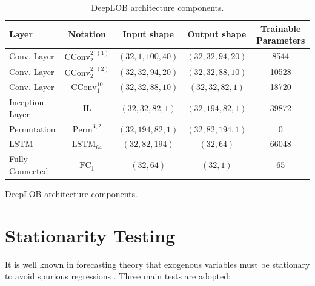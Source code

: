 \documentclass[10pt,a4paper,oneside]{article}
\DeclareMathOperator{\perm}{Perm}
\DeclareMathOperator{\fullyconnected}{FC}
\DeclareMathOperator{\lstm}{LSTM}
\providecommand{\DIFaddtex}[1]{{\protect\color{blue} \sf #1}} %
\providecommand{\DIFdeltex}[1]{{\protect\color{red} \scriptsize #1}} %
\providecommand{\DIFaddFL}[1]{\DIFadd{#1}} %
\providecommand{\DIFdelFL}[1]{\DIFdel{#1}} %
\providecommand{\DIFaddbeginFL}{} %
\providecommand{\DIFaddendFL}{} %
\providecommand{\DIFdelbeginFL}{} %
\providecommand{\DIFdelendFL}{} %
\providecommand{\DIFadd}[1]{\texorpdfstring{\DIFaddtex{#1}}{#1}} %
\providecommand{\DIFdel}[1]{\texorpdfstring{\DIFdeltex{#1}}{}} %
\newcommand{\DIFscaledelfig}{0.5}
\newlength{\DIFdelgraphicswidth} %
\newlength{\DIFdelgraphicsheight} %
\newcommand{\DIFaddincludegraphics}[2][]{{\color{blue}\fbox{\DIFOincludegraphics[#1]{#2}}}} %
\newcommand{\DIFdelincludegraphics}[2][]{%
\sbox{\DIFdelgraphicsbox}{\DIFOincludegraphics[#1]{#2}}%
\settoboxwidth{\DIFdelgraphicswidth}{\DIFdelgraphicsbox} %
\settoboxtotalheight{\DIFdelgraphicsheight}{\DIFdelgraphicsbox} %
\scalebox{\DIFscaledelfig}{%
\parbox[b]{\DIFdelgraphicswidth}{\usebox{\DIFdelgraphicsbox}\\[-\baselineskip] \rule{\DIFdelgraphicswidth}{0em}}\llap{\resizebox{\DIFdelgraphicswidth}{\DIFdelgraphicsheight}{%
\setlength{\unitlength}{\DIFdelgraphicswidth}%
\begin{picture}(1,1)%
\thicklines\linethickness{2pt} %
{\color[rgb]{1,0,0}\put(0,0){\framebox(1,1){}}}%
{\color[rgb]{1,0,0}\put(0,0){\line( 1,1){1}}}%
{\color[rgb]{1,0,0}\put(0,1){\line(1,-1){1}}}%
\end{picture}%
}\hspace*{3pt}}} %
} %
\DeclareRobustCommand{\DIFaddbeginFL}{\DIFOaddbeginFL \let\includegraphics\DIFaddincludegraphics} %
\DeclareRobustCommand{\DIFaddendFL}{\DIFOaddendFL \let\includegraphics\DIFOincludegraphics} %
\DeclareRobustCommand{\DIFdelbeginFL}{\DIFOdelbeginFL \let\includegraphics\DIFdelincludegraphics} %
\DeclareRobustCommand{\DIFdelendFL}{\DIFOaddendFL \let\includegraphics\DIFOincludegraphics} %
\begin{document}
\begin{table}[htb]
  \DIFaddbeginFL \caption{\DIFaddFL{DeepLOB architecture components.}}
  \label{tab:deeplob}

\DIFaddendFL \centering
\begin{tabular}{@{}lcccc@{}}
\toprule
Layer           & Notation           & Input shape        & Output shape          & Trainable Parameters  \\ \midrule
Conv. Layer     & $\mathrm{CConv}^{2, (1)}_{2}$ & $(32, 1, 100, 40)$ & $(32, 32, 94, 20)$   & 8544                  \\
Conv. Layer     & $\mathrm{CConv}^{2, (2)}_2$   & $(32, 32, 94, 20)$ & $(32,  32,  88, 10)$ & 10528                 \\
Conv. Layer     & $\mathrm{CConv}^{10}_1$       & $(32, 32, 88, 10)$ & $(32, 32, 82, 1)$    & 18720                 \\
Inception Layer & $\mathrm{IL}$               & $(32,  32, 82, 1)$ & $(32, 194, 82, 1)$   & 39872                 \\
Permutation     & $\perm^{3,2}$        & $(32, 194, 82, 1)$ & $(32, 82, 194, 1)$   & 0                     \\
LSTM            & $\lstm_{64}$        & $(32, 82, 194)$    & $(32, 64)$           & 66048                 \\ 
Fully Connected & $\fullyconnected_{1}$    & $(32, 64)$         & $(32, 1)$            & 65   \\\bottomrule
\end{tabular}
\DIFdelbeginFL %
{%
\DIFdelFL{DeepLOB architecture components.}}
\DIFdelendFL \DIFaddbeginFL 

\DIFaddendFL \end{table}



\clearpage
\section{Stationarity Testing}
\label{ap:stationarity_testing}

It is well known in forecasting theory that exogenous variables must be stationary to avoid spurious regressions \cite{xie2006spurious}. Three main tests are adopted:
\end{document}
